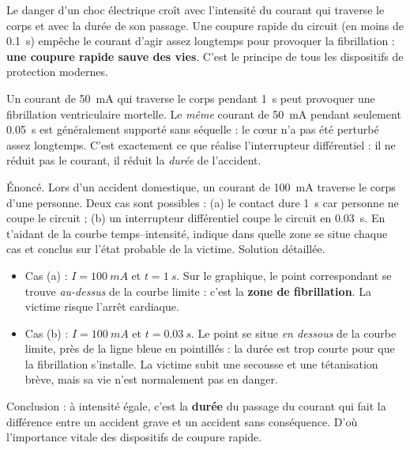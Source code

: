 \documentclass[11pt]{article}
\newcommand{\cle}[1]{{\popxbold\color{popdark}#1}}
\begin{document}
\begin{propriete}
Le danger d'un choc électrique \cle{croît avec l'intensité} du courant qui traverse le corps \cle{et avec la durée} de son passage. Une coupure rapide du circuit (en moins de \SI{0,1}{s}) empêche le courant d'agir assez longtemps pour provoquer la fibrillation : \textbf{une coupure rapide sauve des vies}. C'est le principe de tous les dispositifs de protection modernes.
\end{propriete}

\begin{exemplebox}
Un courant de \SI{50}{mA} qui traverse le corps pendant \SI{1}{s} peut provoquer une fibrillation ventriculaire mortelle. Le \emph{même} courant de \SI{50}{mA} pendant seulement \SI{0,05}{s} est généralement supporté sans séquelle : le cœur n'a pas été perturbé assez longtemps. C'est exactement ce que réalise l'interrupteur différentiel : il ne réduit pas le courant, il réduit la \emph{durée} de l'accident.
\end{exemplebox}

\begin{exoresolu}
Énoncé. Lors d'un accident domestique, un courant de \SI{100}{mA} traverse le corps d'une personne. Deux cas sont possibles : (a) le contact dure \SI{1}{s} car personne ne coupe le circuit ; (b) un interrupteur différentiel coupe le circuit en \SI{0,03}{s}. En t'aidant de la courbe temps--intensité, indique dans quelle zone se situe chaque cas et conclus sur l'état probable de la victime.
\tcblower
Solution détaillée.
\begin{itemize}
\item Cas (a) : $I = \SI{100}{mA}$ et $t = \SI{1}{s}$. Sur le graphique, le point correspondant se trouve \emph{au-dessus} de la courbe limite : c'est la \textbf{zone de fibrillation}. La victime risque l'arrêt cardiaque.
\item Cas (b) : $I = \SI{100}{mA}$ et $t = \SI{0,03}{s}$. Le point se situe \emph{en dessous} de la courbe limite, près de la ligne bleue en pointillés : la durée est trop courte pour que la fibrillation s'installe. La victime subit une secousse et une tétanisation brève, mais sa vie n'est normalement pas en danger.
\end{itemize}
Conclusion : à intensité égale, c'est la \textbf{durée} du passage du courant qui fait la différence entre un accident grave et un accident sans conséquence. D'où l'importance vitale des dispositifs de coupure rapide.
\end{exoresolu}
\end{document}
